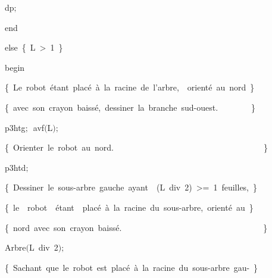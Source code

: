 {\vspace{\neglskip}\mbox{\blc  \blk\blk\blk\blk\idt  dp$;$}\par 
\vspace{\neglskip}\mbox{\blc  \blk\blk\blk\idt  \mcl end\idt }\par 
\pagebreak[3] 
\vspace{\neglskip}\mbox{\blc  \blk\blk\idt  \mcl else\idt \ \cmt  \{\ L\ >\ 1\ \}\idt }\par 
\vspace{\neglskip}\mbox{\blc  \blk\blk\blk\idt  \mcl begin\idt }\par 
\vspace{\neglskip}\mbox{\blc  \blk\blk\blk\blk\idt  \cmt  \{\ Le\ robot\ étant\ placé\ à\ la\ racine\ de\ l{'}arbre,\ \ orienté\ au\ nord\ \}\idt }\par 
\vspace{\neglskip}\mbox{\blc  \blk\blk\blk\blk\idt  \cmt  \{\ avec\ son\ crayon\ baissé,\ dessiner\ la\ branche\ sud-ouest.\ \ \ \ \ \ \ \ \}\idt }\par 
\vspace{\neglskip}\mbox{\blc  \blk\blk\blk\blk\idt  p3htg$;$\ avf$($L$)$$;$\ }\par 
\vspace{\neglskip}\mbox{\blc  \blk\blk\blk\blk\idt  \cmt  \{\ Orienter\ le\ robot\ au\ nord.\ \ \ \ \ \ \ \ \ \ \ \ \ \ \ \ \ \ \ \ \ \ \ \ \ \ \ \ \ \ \ \ \ \ \ \ \}\idt }\par 
\vspace{\neglskip}\mbox{\blc  \blk\blk\blk\blk\idt  p3htd$;$}\par 
\vspace{\neglskip}\mbox{\blc  \blk\blk\blk\blk\idt  \cmt  \{\ Dessiner\ le\ sous-arbre\ gauche\ ayant\ \ (L\ div\ 2)\ >=\ 1\ feuilles,\ \}\idt }\par 
\vspace{\neglskip}\mbox{\blc  \blk\blk\blk\blk\idt  \cmt  \{\ le\ \ robot\ \ étant\ \ placé\ à\ la\ racine\ du\ sous-arbre,\ orienté\ au\ \}\idt }\par 
\vspace{\neglskip}\mbox{\blc  \blk\blk\blk\blk\idt  \cmt  \{\ nord\ avec\ son\ crayon\ baissé.\ \ \ \ \ \ \ \ \ \ \ \ \ \ \ \ \ \ \ \ \ \ \ \ \ \ \ \ \ \ \ \ \ \ \}\idt }\par 
\vspace{\neglskip}\mbox{\blc  \blk\blk\blk\blk\idt  Arbre$($L\ \mcl div\idt \ 2$)$$;$\ }\par 
\vspace{\neglskip}\mbox{\blc  \blk\blk\blk\blk\idt  \cmt  \{\ Sachant\ que\ le\ robot\ est\ placé\ à\ la\ racine\ du\ sous-arbre\ gau-\ \}\idt }\par 
}

